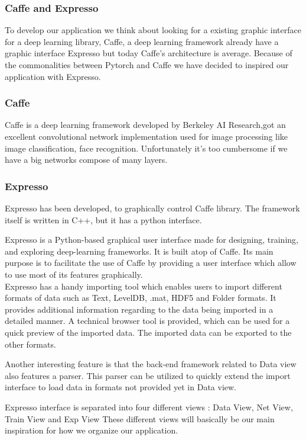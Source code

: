 \subsubsection{Caffe and Expresso}
To develop our application we think about looking for a existing graphic interface for a deep learning library, Caffe, a deep learning framework already have a graphic interface Expresso but today Caffe's architecture is average.
\newline
Because of the commonalities between Pytorch and Caffe we have decided to inspired our application with Expresso.

\subsubsection{Caffe}
Caffe is a deep learning framework developed by Berkeley AI Research,got an excellent convolutional network implementation used for image processing like image classification, face recognition. Unfortunately it's too cumbersome if we have a big networks compose of many layers.

\subsubsection{Expresso}
Expresso has been developed, to graphically control Caffe library. The framework itself is written in C++, but it has a python interface.

\noindent Expresso is a Python-based graphical user interface made for designing, training, and exploring deep-learning frameworks. It is built atop of Caffe. Its main purpose is to facilitate the use of Caffe by providing a user interface which allow to use most of its features graphically.\\

\noindent Expresso has a handy importing tool which enables users to import different formats of data such as Text, LevelDB, .mat, HDF5 and Folder formats. It provides additional information regarding to the data being imported in a detailed manner.
A technical browser tool is provided, which can be used for a quick preview of the imported data.
The imported data can be exported to the other formats. 

\noindent Another interesting feature is that the back-end framework related to Data view also features a parser. This parser can be utilized to quickly extend the import interface to load data in formats not provided yet in Data view.

\noindent Expresso interface is separated into four different views : Data View, Net View, Train View and Exp View
These different views will basically be our main inspiration for how we organize our application.

